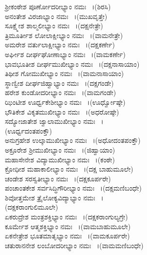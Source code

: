 \newpage
{}  ಶ್ರೀಕಂಠೇಶ ಪೂರ್ಣೋದರೀಭ್ಯಾಂ ನಮಃ ~।(ಶಿರಸಿ)\\
  ಅನಂತೇಶ ವಿರಜಾಭ್ಯಾಂ ನಮಃ  ~।(ಮುಖವೃತ್ತೇ)\\
  ಸೂಕ್ಷ್ಮೇಶ ಶಾಲ್ಮಲೀಭ್ಯಾಂ ನಮಃ  ~।(ದಕ್ಷನೇತ್ರೇ)\\
  ತ್ರಿಮೂರ್ತೀಶ ಲೋಲಾಕ್ಷೀಭ್ಯಾಂ ನಮಃ  ~।(ವಾಮನೇತ್ರೇ)\\
  ಅಮರೇಶ ವರ್ತುಲಾಕ್ಷೀಭ್ಯಾಂ ನಮಃ  ~।(ದಕ್ಷಕರ್ಣೇ)\\
  ಅರ್ಘೀಶ ದೀರ್ಘಘೋಣಾಭ್ಯಾಂ ನಮಃ  ~।(ವಾಮಕರ್ಣೇ)\\
  ಭಾವಭೂತೀಶ ದೀರ್ಘಮುಖೀಭ್ಯಾಂ ನಮಃ  ~।(ದಕ್ಷನಾಸಾಯಾಂ)\\
  ತಿಥೀಶ ಗೋಮುಖೀಭ್ಯಾಂ ನಮಃ  ~।(ವಾಮನಾಸಾಯಾಂ)\\
  ಸ್ಥಾಣ್ವೀಶ ದೀರ್ಘಜಿಹ್ವಾಭ್ಯಾಂ ನಮಃ  ~।(ದಕ್ಷಗಂಡೇ)\\
  ಹರೇಶ ಕುಂಡೋದರೀಭ್ಯಾಂ ನಮಃ  ~।(ವಾಮಗಂಡೇ)\\
  ಝಿಂಟೀಶ ಊರ್ಧ್ವಕೇಶೀಭ್ಯಾಂ ನಮಃ  ~।(ಊರ್ಧ್ವೋಷ್ಠೇ)\\
  ಭೌತಿಕೇಶ ವಿಕೃತಮುಖೀಭ್ಯಾಂ ನಮಃ  ~।(ಅಧರೋಷ್ಠೇ)\\
  ಸದ್ಯೋಜಾತೇಶ ಜ್ವಾಲಾಮುಖೀಭ್ಯಾಂ ನಮಃ  ~।\\(ಊರ್ಧ್ವದಂತಪಂಕ್ತೌ)\\
  ಅನುಗ್ರಹೇಶ ಉಲ್ಕಾಮುಖೀಭ್ಯಾಂ ನಮಃ  ~।(ಅಧೋದಂತಪಂಕ್ತೌ)\\
  ಅಕ್ರೂರೇಶ ಶ್ರೀಮುಖೀಭ್ಯಾಂ ನಮಃ  ~।(ಜಿಹ್ವಾಯಾಂ)\\
  ಮಹಾಸೇನೇಶ ವಿದ್ಯಾಮುಖೀಭ್ಯಾಂ ನಮಃ  ~।(ಕಂಠೇ)\\
  ಕ್ರೋಧೀಶ ಮಹಾಕಾಲೀಭ್ಯಾಂ ನಮಃ  ~।(ದಕ್ಷ ಬಾಹುಮೂಲೇ)\\
  ಚಂಡೇಶ ಸರಸ್ವತೀಭ್ಯಾಂ ನಮಃ  ~।(ದಕ್ಷಕೂರ್ಪರೇ)\\
  ಪಂಚಾಂತಕೇಶ ಸರ್ವಸಿದ್ಧಿಗೌರೀಭ್ಯಾಂ ನಮಃ  ~।(ದಕ್ಷಮಣಿಬಂಧೇ)\\
  ಶಿವೋತ್ತಮೇಶ ತ್ರೈಲೋಕ್ಯವಿದ್ಯಾಭ್ಯಾಂ ನಮಃ  ~।\\(ದಕ್ಷಕರಾಂಗುಲಿಮೂಲೇ)\\
  ಏಕರುದ್ರೇಶ ಮಂತ್ರಶಕ್ತಿಭ್ಯಾಂ ನಮಃ  ~।(ದಕ್ಷಕರಾಂಗುಲ್ಯಗ್ರೇ)\\
  ಕೂರ್ಮೇಶ ಆತ್ಮಶಕ್ತಿಭ್ಯಾಂ ನಮಃ  ~।(ವಾಮಬಾಹುಮೂಲೇ)\\
  ಏಕನೇತ್ರೇಶ ಭೂತಮಾತೃಭ್ಯಾಂ ನಮಃ  ~।(ವಾಮಕೂರ್ಪರೇ)\\
  ಚತುರಾನನೇಶ ಲಂಬೋದರೀಭ್ಯಾಂ ನಮಃ  ~।(ವಾಮಮಣಿಬಂಧೇ)\\

